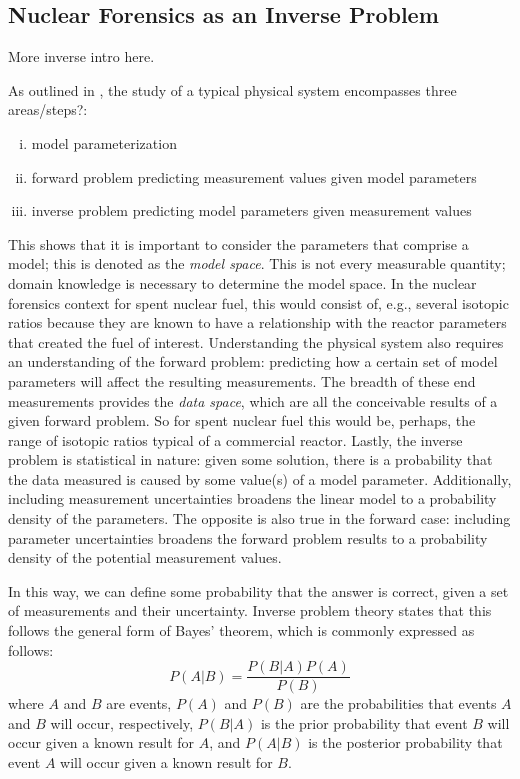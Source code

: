 \subsection{Nuclear Forensics as an Inverse Problem}
\label{sec:inverse}

More inverse intro here.

As outlined in , the study of a typical physical
system encompasses three areas/steps?:
\begin{enumerate}[(i)]
\setlength{\itemsep}{1pt}
\item model parameterization 
\item forward problem predicting measurement values given model parameters 
\item inverse problem predicting model parameters given measurement values 
\end{enumerate}

This shows that it is important to consider the parameters that comprise a
model; this is denoted as the \textit{model space}. This is not every
measurable quantity; domain knowledge is necessary to determine the model
space. In the nuclear forensics context for spent nuclear fuel, this would
consist of, e.g., several isotopic ratios because they are known to have a
relationship with the reactor parameters that created the fuel of interest.
Understanding the physical system also requires an understanding of the forward
problem: predicting how a certain set of model parameters will affect the
resulting measurements. The breadth of these end measurements provides the
\textit{data space}, which are all the conceivable results of a given forward
problem. So for spent nuclear fuel this would be, perhaps, the range of
isotopic ratios typical of a commercial reactor. Lastly, the inverse problem is
statistical in nature: given some solution, there is a probability that the
data measured is caused by some value(s) of a model parameter. Additionally,
including measurement uncertainties broadens the linear model to a probability
density of the parameters. The opposite is also true in the forward case:
including parameter uncertainties broadens the forward problem results to a
probability density of the potential measurement values.

In this way, we can define some probability that the answer is correct, given a
set of measurements and their uncertainty. Inverse problem theory states that
this follows the general form of Bayes' theorem, which is commonly expressed as
follows:
\begin{equation}
P(A|B) = \frac{P(B|A)P(A)}{P(B)}
\end{equation}
where $A$ and $B$ are events, $P(A)$ and $P(B)$ are the probabilities that events
$A$ and $B$ will occur, respectively, $P(B|A)$ is the prior probability that event 
$B$ will occur given a known result for $A$, and $P(A|B)$ is the posterior 
probability that event $A$ will occur given a known result for $B$.

